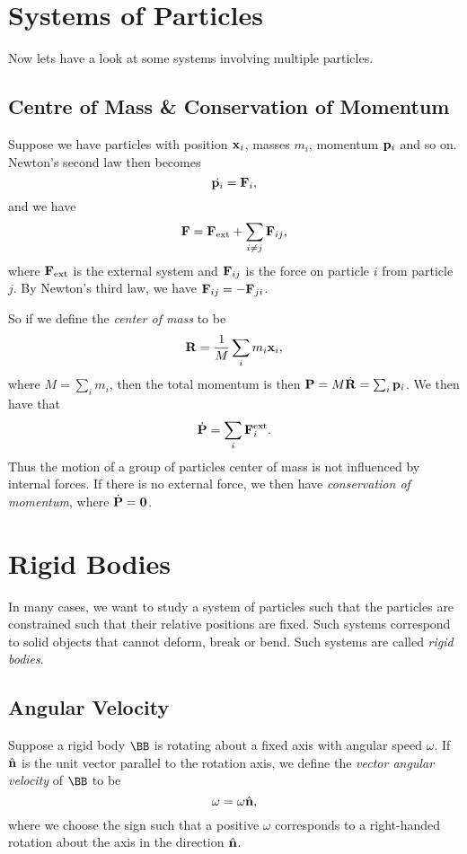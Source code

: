 \documentclass[a4paper]{scrartcl}
\newcommand{\hh}[1]{\hat{\vv{#1}}}
\begin{document}
\section{Systems of Particles}

Now lets have a look at some systems involving multiple particles.

\subsection{Centre of Mass \& Conservation of Momentum}

Suppose we have particles with position $\mathbf{x}_i$, masses $m_i$, momentum $\mathbf{p}_i$ and so on. Newton's second law then becomes
$$
\dot{\mathbf{p}_i} = \mathbf{F}_i,
$$
and we have
$$
\mathbf{F} = \mathbf{F}_{\text{ext}} + \sum_{i \neq j} \mathbf{F}_{ij},
$$
where $\mathbf{F}_{\text{ext}}$ is the external system and $\mathbf{F}_{ij}$ is the force on particle $i$ from particle $j$. By Newton's third law, we have $\mathbf{F}_{ij} = - \mathbf{F}_{ji}$.

So if we define the \emph{center of mass} to be
$$
\mathbf{R} = \frac{1}{M} \sum_i m_i \mathbf{x}_i,
$$
where $M = \sum_i m_i$, then the total momentum is then $\mathbf{P} = M \dot{\mathbf{R}} = \sum_{i} \mathbf{p}_i$. We then have that
$$
\dot{\mathbf{P}} = \sum_i \mathbf{F}_i^{\text{ext}}.
$$
Thus the motion of a group of particles center of mass is not influenced by internal forces. If there is no external force, we then have \emph{conservation of momentum}, where $\dot{\mathbf{P}} = \mathbf{0}$.

%



\section{Rigid Bodies}


In many cases, we want to study a system of particles such that the particles are constrained such that their relative positions are fixed. Such systems correspond to solid objects that cannot deform, break or bend. 
Such systems are called \emph{rigid bodies}.

\subsection{Angular Velocity}

Suppose a rigid body $\BB$ is rotating about a fixed axis with angular speed $\omega$. If $\hh n$ is the unit vector parallel to the rotation axis, we define the \emph{vector angular velocity} of $\BB$ to be
$$
\vv \omega = \omega \hh n,
$$
where we choose the sign such that a positive $\omega$ corresponds to a right-handed rotation about the axis in the direction $\hh n$.
\end{document}
